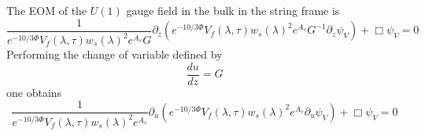 \documentclass[10 pt]{article}
\begin{document}
The EOM of the $U(1)$ gauge field in the bulk in the string frame is
\begin{equation}
\frac{1}{e^{-10/3 \Phi}V_f\left(\lambda, \tau\right) {w_s\left(\lambda\right)}^2 e^{A_s} G} \partial_z \left( e^{-10/3 \Phi}V_f\left(\lambda, \tau\right) {w_s\left(\lambda\right)}^2 e^{A_s} G^{-1} \partial_z \psi_V \right) + \Box \psi_V = 0
\end{equation}
Performing the change of variable defined by
\begin{equation}
\frac{du}{dz} = G
\end{equation}
one obtains
\begin{equation}
\frac{1}{e^{-10/3 \Phi}V_f\left(\lambda, \tau\right) {w_s\left(\lambda\right)}^2 e^{A_s} } \partial_u \left( e^{-10/3 \Phi}V_f\left(\lambda, \tau\right) {w_s\left(\lambda\right)}^2 e^{A_s}  \partial_u \psi_V \right) + \Box \psi_V = 0
\end{equation}











































































\end{document}
